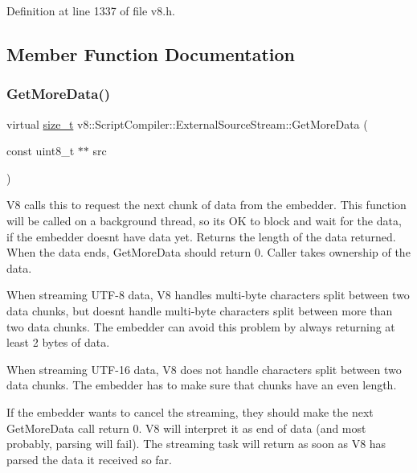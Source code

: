 Definition at line 1337 of file v8.\+h.



\subsection{Member Function Documentation}
\mbox{\label{classv8_1_1ScriptCompiler_1_1ExternalSourceStream_ac3a0221b5725f0b612a6342d8e83d899}} 
\subsubsection{\texorpdfstring{Get\+More\+Data()}{GetMoreData()}}
{\footnotesize\ttfamily virtual \mbox{\hyperlink{classsize__t}{size\+\_\+t}} v8\+::\+Script\+Compiler\+::\+External\+Source\+Stream\+::\+Get\+More\+Data (\begin{DoxyParamCaption}\item[{const uint8\+\_\+t $\ast$$\ast$}]{src }\end{DoxyParamCaption})\hspace{0.3cm}{\ttfamily [pure virtual]}}

V8 calls this to request the next chunk of data from the embedder. This function will be called on a background thread, so it\textquotesingle{}s OK to block and wait for the data, if the embedder doesn\textquotesingle{}t have data yet. Returns the length of the data returned. When the data ends, Get\+More\+Data should return 0. Caller takes ownership of the data.

When streaming U\+T\+F-\/8 data, V8 handles multi-\/byte characters split between two data chunks, but doesn\textquotesingle{}t handle multi-\/byte characters split between more than two data chunks. The embedder can avoid this problem by always returning at least 2 bytes of data.

When streaming U\+T\+F-\/16 data, V8 does not handle characters split between two data chunks. The embedder has to make sure that chunks have an even length.

If the embedder wants to cancel the streaming, they should make the next Get\+More\+Data call return 0. V8 will interpret it as end of data (and most probably, parsing will fail). The streaming task will return as soon as V8 has parsed the data it received so far. 

